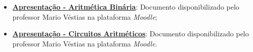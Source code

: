 \begin{itemize}
    \item \href{https://2425moodle.isel.pt/pluginfile.php/1254903/mod_folder/content/0/Aula%20T7%20-%20Aritm%C3%A9tica%20Bin%C3%A1ria%20-%20Parte%202.pdf?forcedownload=0}{\textbf{Apresentação - Aritmética Binária}}: Documento disponibilizado pelo professor Mario Véstias na plataforma \textit{Moodle};

    \item \href{https://2425moodle.isel.pt/pluginfile.php/1254903/mod_folder/content/0/Aula%20T8%20-%20Circuitos%20Aritm%C3%A9ticos.pdf?forcedownload=0}{\textbf{Apresentação - Circuitos Aritméticos}}: Documento disponibilizado pelo professor Mario Véstias na plataforma \textit{Moodle}.

\end{itemize}

\newpage